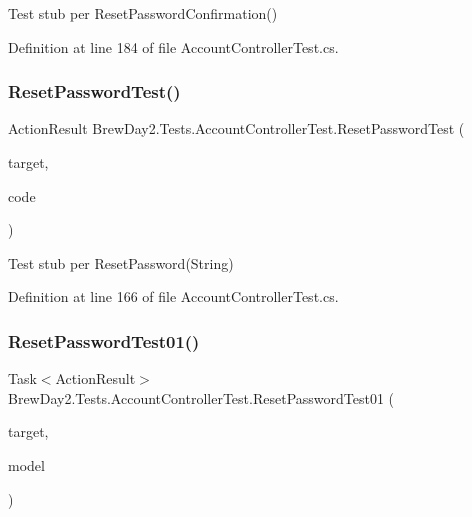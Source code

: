 Test stub per Reset\+Password\+Confirmation()



Definition at line 184 of file Account\+Controller\+Test.\+cs.

\mbox{\label{class_brew_day2_1_1_tests_1_1_account_controller_test_ad35283ffbf30e2f60fbe2a97a3fbb578}} 
\subsubsection{\texorpdfstring{Reset\+Password\+Test()}{ResetPasswordTest()}}
{\footnotesize\ttfamily Action\+Result Brew\+Day2.\+Tests.\+Account\+Controller\+Test.\+Reset\+Password\+Test (\begin{DoxyParamCaption}\item[{\mbox{[}\+Pex\+Assume\+Under\+Test\mbox{]} \mbox{\hyperlink{class_brew_day2_1_1_controllers_1_1_account_controller}{Account\+Controller}}}]{target,  }\item[{string}]{code }\end{DoxyParamCaption})}



Test stub per Reset\+Password(\+String)



Definition at line 166 of file Account\+Controller\+Test.\+cs.

\mbox{\label{class_brew_day2_1_1_tests_1_1_account_controller_test_a512bedc2f892f896b7f00900bb9741e3}} 
\subsubsection{\texorpdfstring{Reset\+Password\+Test01()}{ResetPasswordTest01()}}
{\footnotesize\ttfamily Task$<$Action\+Result$>$ Brew\+Day2.\+Tests.\+Account\+Controller\+Test.\+Reset\+Password\+Test01 (\begin{DoxyParamCaption}\item[{\mbox{[}\+Pex\+Assume\+Under\+Test\mbox{]} \mbox{\hyperlink{class_brew_day2_1_1_controllers_1_1_account_controller}{Account\+Controller}}}]{target,  }\item[{\mbox{\hyperlink{class_brew_day2_1_1_models_1_1_reset_password_view_model}{Reset\+Password\+View\+Model}}}]{model }\end{DoxyParamCaption})}



